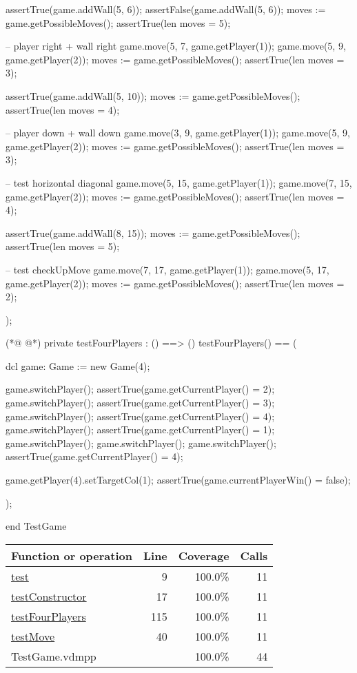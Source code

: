 \begin{vdmpp}[breaklines=true]
  assertTrue(game.addWall(5, 6));
  assertFalse(game.addWall(5, 6));
  moves := game.getPossibleMoves();
  assertTrue(len moves = 5);
  
  -- player right + wall right
  game.move(5, 7, game.getPlayer(1));
  game.move(5, 9, game.getPlayer(2));
  moves := game.getPossibleMoves();
  assertTrue(len moves = 3);
  
  assertTrue(game.addWall(5, 10));
  moves := game.getPossibleMoves();
  assertTrue(len moves = 4);
  
  -- player down + wall down
  game.move(3, 9, game.getPlayer(1));
  game.move(5, 9, game.getPlayer(2));
  moves := game.getPossibleMoves();
  assertTrue(len moves = 3);
  
  -- test horizontal diagonal
  game.move(5, 15, game.getPlayer(1));
  game.move(7, 15, game.getPlayer(2));
  moves := game.getPossibleMoves();
  assertTrue(len moves = 4);
  
  assertTrue(game.addWall(8, 15));
  moves := game.getPossibleMoves();
  assertTrue(len moves = 5);
  
  -- test checkUpMove
  game.move(7, 17, game.getPlayer(1));
  game.move(5, 17, game.getPlayer(2));
  moves := game.getPossibleMoves();
  assertTrue(len moves = 2);
  
 );
 
(*@
\label{testFourPlayers:115}
@*)
 private testFourPlayers : () ==> ()
 testFourPlayers() ==
 (
 
  dcl
  game: Game := new Game(4);
  
  game.switchPlayer();
  assertTrue(game.getCurrentPlayer() = 2);
  game.switchPlayer();
  assertTrue(game.getCurrentPlayer() = 3);
  game.switchPlayer();
  assertTrue(game.getCurrentPlayer() = 4);
  game.switchPlayer();
  assertTrue(game.getCurrentPlayer() = 1);
  game.switchPlayer();
  game.switchPlayer();
  game.switchPlayer();
  assertTrue(game.getCurrentPlayer() = 4);
  
  game.getPlayer(4).setTargetCol(1);
  assertTrue(game.currentPlayerWin() = false);
 
 );
 
end TestGame
\end{vdmpp}
\bigskip
\begin{longtable}{|l|r|r|r|}
\hline
Function or operation & Line & Coverage & Calls \\
\hline
\hline
\hyperref[test:9]{test} & 9&100.0\% & 11 \\
\hline
\hyperref[testConstructor:17]{testConstructor} & 17&100.0\% & 11 \\
\hline
\hyperref[testFourPlayers:115]{testFourPlayers} & 115&100.0\% & 11 \\
\hline
\hyperref[testMove:40]{testMove} & 40&100.0\% & 11 \\
\hline
\hline
TestGame.vdmpp & & 100.0\% & 44 \\
\hline
\end{longtable}

